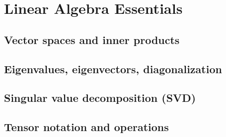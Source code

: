 ﻿\chapter{Linear Algebra Essentials}
\section{Vector spaces and inner products}

\section{Eigenvalues, eigenvectors, diagonalization}

\section{Singular value decomposition (SVD)}

\section{Tensor notation and operations}


